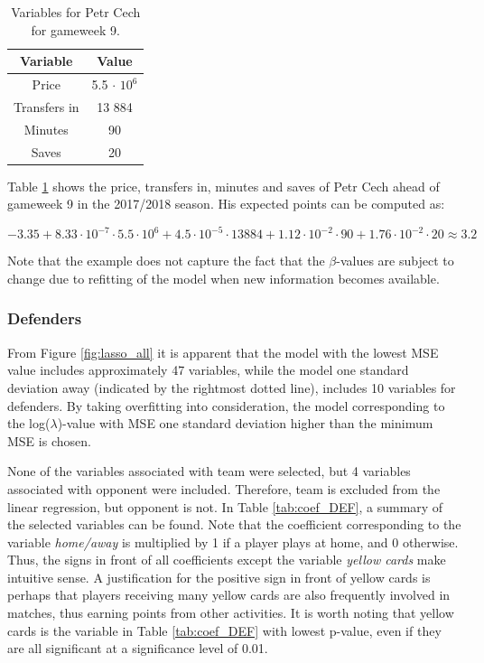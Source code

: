 \begin{table}[H]
\centering
\begin{tabular}{|c|c|}
\hline
Variable     & Value   \\ \hline
Price         & 5.5 $\cdot$ $10^6$ \\
Transfers in & 13 884   \\
Minutes      & 90      \\
Saves        & 20     \\
\hline
\end{tabular}
\caption{Variables for Petr Cech for gameweek 9.}
\label{tab:var_petr}
\end{table}

Table \ref{tab:var_petr} shows the price, transfers in, minutes and saves of Petr Cech ahead of gameweek 9 in the 2017/2018 season. His expected points can be computed as:

\begin{equation*}
    -3.35 + 8.33 \cdot 10^{-7} \cdot 5.5 \cdot 10^6 + 4.5 \cdot 10^{-5} \cdot 13 884 + 1.12 \cdot 10^{-2} \cdot 90 + 1.76 \cdot 10^{-2} \cdot 20 \approx 3.2
\end{equation*}

Note that the example does not capture the fact that the $\beta$-values are subject to change due to refitting of the model when new information becomes available.


\subsubsection{Defenders}

From Figure \ref{fig:lasso_all} it is apparent that the model with the lowest MSE value includes approximately 47 variables, while the model one standard deviation away (indicated by the rightmost dotted line), includes 10 variables for defenders. By taking overfitting into consideration, the model corresponding to the log($\lambda$)-value with MSE one standard deviation higher than the minimum MSE is chosen.

\newpar

None of the variables associated with team were selected, but 4 variables associated with opponent were included. Therefore, team is excluded from the linear regression, but opponent is not. In Table \ref{tab:coef_DEF}, a summary of the selected variables can be found. Note that the coefficient corresponding to the variable \textit{home/away} is multiplied by 1 if a player plays at home, and 0 otherwise. Thus, the signs in front of all coefficients except the variable \textit{yellow cards} make intuitive sense. A justification for the positive sign in front of yellow cards is perhaps that players receiving many yellow cards are also frequently involved in matches, thus earning points from other activities. It is worth noting that yellow cards is the variable in Table \ref{tab:coef_DEF} with lowest p-value, even if they are all significant at a significance level of 0.01.

